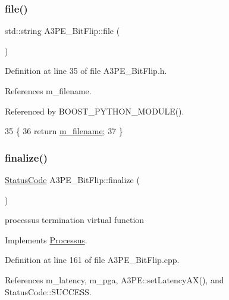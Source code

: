 \subsubsection{\texorpdfstring{file()}{file()}}
{\footnotesize\ttfamily std\+::string A3\+P\+E\+\_\+\+Bit\+Flip\+::file (\begin{DoxyParamCaption}{ }\end{DoxyParamCaption})\hspace{0.3cm}{\ttfamily [inline]}}



Definition at line 35 of file A3\+P\+E\+\_\+\+Bit\+Flip.\+h.



References m\+\_\+filename.



Referenced by B\+O\+O\+S\+T\+\_\+\+P\+Y\+T\+H\+O\+N\+\_\+\+M\+O\+D\+U\+L\+E().


\begin{DoxyCode}
35                   \{
36     \textcolor{keywordflow}{return} \hyperlink{classA3PE__BitFlip_a72eecaff11d66c7f3eee10a9b2bfa301}{m\_filename};
37   \}
\end{DoxyCode}
\mbox{\label{classA3PE__BitFlip_ab40772a001613a0e1932d1e356ccf717}} 
\subsubsection{\texorpdfstring{finalize()}{finalize()}}
{\footnotesize\ttfamily \hyperlink{classStatusCode}{Status\+Code} A3\+P\+E\+\_\+\+Bit\+Flip\+::finalize (\begin{DoxyParamCaption}{ }\end{DoxyParamCaption})\hspace{0.3cm}{\ttfamily [virtual]}}

processus termination virtual function 

Implements \hyperlink{classProcessus_aba93d691f031bdb18ae4b8afb1b2e856}{Processus}.



Definition at line 161 of file A3\+P\+E\+\_\+\+Bit\+Flip.\+cpp.



References m\+\_\+latency, m\+\_\+pga, A3\+P\+E\+::set\+Latency\+A\+X(), and Status\+Code\+::\+S\+U\+C\+C\+E\+SS.



